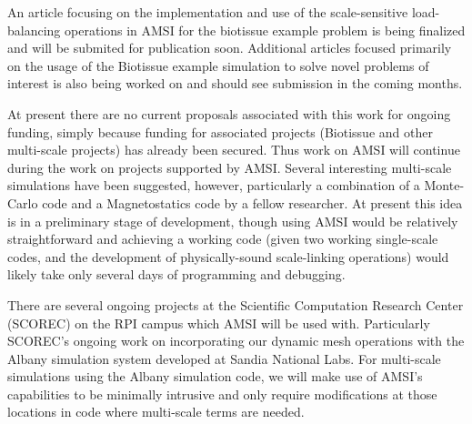 An article focusing on the implementation and use of the scale-sensitive load-balancing operations in AMSI for the biotissue example problem is being finalized and will be submited for publication soon. Additional articles focused primarily on the usage of the Biotissue example simulation to solve novel problems of interest is also being worked on and should see submission in the coming months.

\label{new-propsals-funding}
At present there are no current proposals associated with this work for ongoing funding, simply because funding for associated projects (Biotissue and other multi-scale projects) has already been secured. Thus work on AMSI will continue during the work on projects supported by AMSI. Several interesting multi-scale simulations have been suggested, however, particularly a combination of a Monte-Carlo code and a Magnetostatics code by a fellow researcher. At present this idea is in a preliminary stage of development, though using AMSI would be relatively straightforward and achieving a working code (given two working single-scale codes, and the development of physically-sound scale-linking operations) would likely take only several days of programming and debugging.

\label{impact-on-programs}
There are several ongoing projects at the Scientific Computation Research Center (SCOREC) on the RPI campus which AMSI will be used with. Particularly SCOREC's ongoing work on incorporating our dynamic mesh operations with the Albany simulation system developed at Sandia National Labs. For multi-scale simulations using the Albany simulation code, we will make use of AMSI's capabilities to be minimally intrusive and only require modifications at those locations in code where multi-scale terms are needed.

